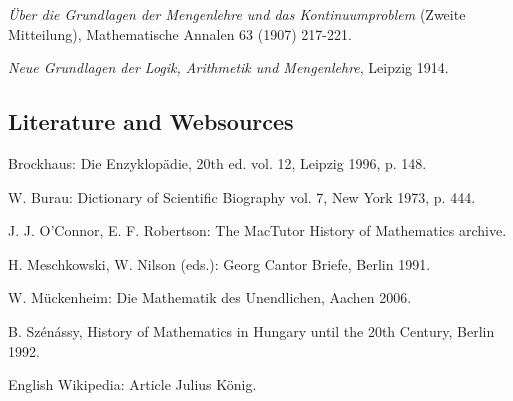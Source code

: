 \documentclass[12pt]{article}
\begin{document}
\emph{\"Uber die Grundlagen der Mengenlehre und das Kontinuumproblem}
(Zweite Mitteilung), Mathematische Annalen 63 (1907) 217-221.

\emph{Neue Grundlagen der Logik, Arithmetik und Mengenlehre}, Leipzig
1914.

\subsection{Literature and Websources}
Brockhaus: Die Enzyklop\"adie, 20th ed. vol. 12, Leipzig 1996, p. 148.

W. Burau: Dictionary of Scientific Biography vol. 7, New York 1973, p. 444.

J. J. O'Connor, E. F. Robertson: The MacTutor History of Mathematics archive.

H. Meschkowski, W. Nilson (eds.): Georg Cantor Briefe, Berlin 1991.

W. M\"uckenheim: Die Mathematik des Unendlichen, Aachen 2006.

B. Sz\'en\'assy, History of Mathematics in Hungary until the 20th Century, Berlin 1992.

English Wikipedia: Article Julius K\"onig.


\end{document}
